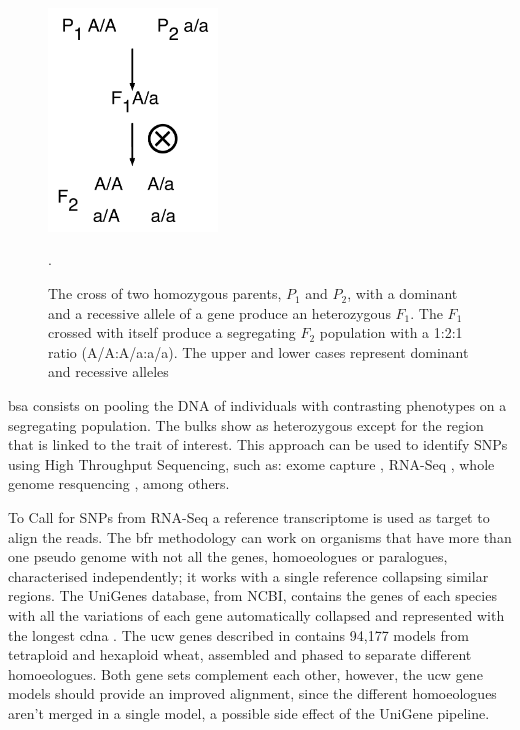 \begin{figure}
  \centering
    \includegraphics[width=0.4\textwidth]{Yr15/Figures/population/F2schematic.pdf}
  \caption{The cross of two homozygous parents, $P_{1}$ and $P_{2}$, with a dominant and a recessive allele of a gene produce an heterozygous $F_{1}$. The $F_{1}$ crossed with itself produce a segregating $F_{2}$ population with a 1:2:1 ratio (A/A:A/a:a/a). The upper and lower cases represent dominant and recessive alleles  }. 
  \label{fig:yr15:f2schematic}
\end{figure}


\gls{bsa} consists on pooling the DNA of individuals with contrasting phenotypes \citep{Michelmore1991} on a segregating population. 
The bulks show as heterozygous except for the region that is linked to the trait of interest. 
This approach can be used to identify SNPs using High Throughput Sequencing, such as: exome capture \citep{Hodges2007}, RNA-Seq \citep{Pickrell2010}, whole genome resquencing \citep{Schneeberger2009}, among others. 

To Call for SNPs from RNA-Seq a reference transcriptome is used as target to align the reads. 
The \gls{bfr} methodology can work on organisms that have more than one pseudo genome with not all the genes, homoeologues or paralogues, characterised independently; it works with a single reference collapsing similar regions. 
The UniGenes database, from NCBI, contains the genes of each species with all the variations of each gene automatically collapsed and represented with the longest \acrshort{cdna} \citep{PontiusJUWagnerL2002}. 
The \acrshort{ucw}  genes described in \citet{Krasileva2013} contains 94,177 models from tetraploid and hexaploid wheat, assembled and phased to separate different homoeologues. 
Both gene sets complement each other, however, the \acrshort{ucw} gene models should provide an improved alignment, since the different homoeologues aren't merged in a single model, a possible side effect of the UniGene pipeline. 

